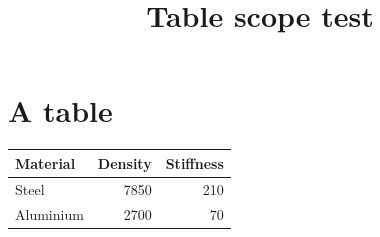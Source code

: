 \documentclass{article}
\title{Table scope test}
\begin{document}
\section{A table}
\begin{tabular}{lrr}
\hline
Material & Density & Stiffness\\
\hline
Steel & 7850 & 210\\
Aluminium & 2700 & 70\\
\hline
\end{tabular}
\end{document}
